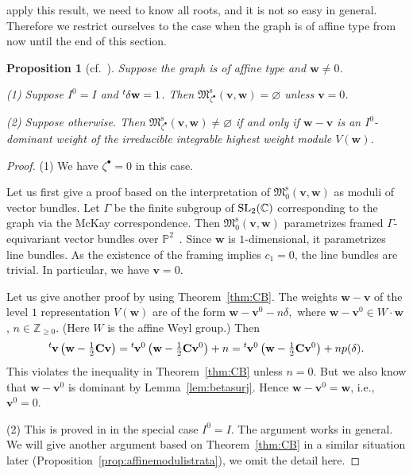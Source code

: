 \documentclass[10pt,a4paper]{amsart}
\newtheorem{Proposition}[equation]{Proposition}
\theoremstyle{definition}
\numberwithin{equation}{section}
\newcommand{\thmref}[1]{Theorem~\ref{#1}}
\newcommand{\lemref}[1]{Lemma~\ref{#1}}
\newcommand{\propref}[1]{Proposition~\ref{#1}}
\newcommand{\lsp}[2]{{\mskip-.3mu}{}^{#1}\mskip-1mu{#2}}
\newcommand{\C}{{\mathbb C}}
\newcommand{\Z}{{\mathbb Z}}
\newcommand{\proj}{{\mathbb P}}
\newcommand{\SL}{\operatorname{\rm SL}}
\newcommand{\M}{{\mathfrak M}} %
\newcommand{\Mreg}{\M^{\operatorname{s}}}
\newcommand{\bv}{{\mathbf v}} %
\newcommand{\bw}{{\mathbf w}} %
\newcommand{\bC}{{\mathbf C}} %
\begin{document}
apply this result, we need to know all roots, and it is not so easy in
general. Therefore we restrict ourselves to the case when the graph is
of af\/f\/ine type from now until the end of this section.

\begin{Proposition}[cf.~]
\label{prop:affinestrata}
Suppose the graph is of affine type and $\bw\neq 0$.

\textup{(1)} Suppose $I^0 = I$ and $\lsp{t}{\delta}\bw = 1$.
%
Then $\Mreg_{\zeta^\bullet}(\bv,\bw) = \varnothing$ unless $\bv = 0$.

\textup{(2)} Suppose otherwise.
%
Then $\Mreg_{\zeta^\bullet}(\bv,\bw) \neq \varnothing$ if and only if
$\bw-\bv$ is an $I^0$-dominant weight
of the irreducible integrable highest weight module $V(\bw)$.
\end{Proposition}

\begin{proof}
(1) We have $\zeta^\bullet = 0$ in this case.

Let us f\/irst give a proof based on the interpretation of
$\Mreg_0(\bv,\bw)$ as moduli of vector bundles.
%
Let $\Gamma$ be the f\/inite subgroup of $\SL_2(\C)$ corresponding to
the graph via the McKay correspondence.
%
Then $\Mreg_0(\bv,\bw)$ parametrizes framed $\Gamma$-equivariant
vector bundles over $\proj^2$~\cite{Lecture}. Since $\bw$ is
$1$-dimensional, it parametrizes line bundles. As the existence of the
framing implies $c_1 = 0$, the line bundles are trivial. In
particular, we have $\bv = 0$.

Let us give another proof by using \thmref{thm:CB}. The weights $\bw -
\bv$ of the level $1$ representation $V(\bw)$ are of the form
\(
  \bw - \bv^0 - n\delta,
\)
where $\bw - \bv^0\in W\cdot \bw$, $n\in\Z_{\ge 0}$.
(Here $W$ is the af\/f\/ine Weyl group.)
Then
\[
   \lsp{t}{\bv}\left(\bw - \tfrac12 \bC \bv\right)
   = \lsp{t}{\bv^0}\left(\bw - \tfrac12 \bC \bv^0\right) + n
   = \lsp{t}{\bv^0}\left(\bw - \tfrac12 \bC \bv^0\right) + n p(\delta).
\]
This violates the inequality in \thmref{thm:CB} unless $n=0$. But we
also know that $\bw - \bv^0$ is dominant by \lemref{lem:betasurj}.
Hence $\bw - \bv^0 = \bw$, i.e., $\bv^0 = 0$.

(2) This is proved in \cite[10.5, 10.8]{Na-alg} in the special case
$I^0 = I$. The argument works in general. We will give another
argument based on \thmref{thm:CB} in a similar situation later
(\propref{prop:affinemodulistrata}), we omit the detail here.
\end{proof}
\end{document}
